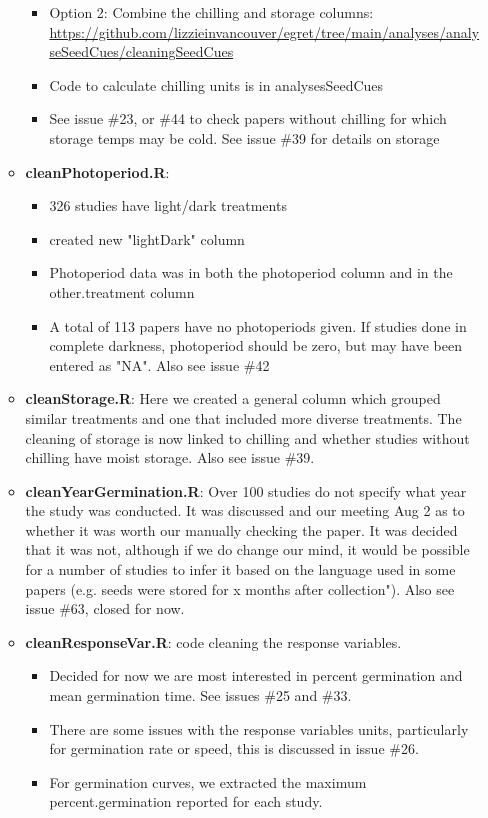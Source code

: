 \documentclass{article}[12pt]
\begin{document}
\begin{enumerate}
\begin{itemize}
\begin{itemize}
\item Option 2: Combine the chilling and storage columns: \url{https://github.com/lizzieinvancouver/egret/tree/main/analyses/analyseSeedCues/cleaningSeedCues}
\item Code to calculate chilling units is in analysesSeedCues
\item See issue \#23, or \#44 to check papers without chilling for which storage temps may be cold. See issue \#39 for details on storage
\end{itemize}
\item \textbf{cleanPhotoperiod.R}: 
\begin{itemize}
\item 326 studies have light/dark treatments
\item created new "lightDark" column
\item Photoperiod data was in both the photoperiod column and in the other.treatment column
\item A total of 113 papers have no photoperiods given. If studies done in complete darkness, photoperiod should be zero, but may have been entered as "NA". Also see issue \#42
\end{itemize}
\item \textbf{cleanStorage.R}: Here we created a general column which grouped similar treatments and one that included more diverse treatments. The cleaning of storage is now linked to chilling and whether studies without chilling have moist storage. Also see issue \#39.
\item \textbf{cleanYearGermination.R}: Over 100 studies do not specify what year the study was conducted. It was discussed and our meeting Aug 2 as to whether it was worth our manually checking the paper. It was decided that it was not, although if we do change our mind, it would be possible for a number of studies to infer it based on the language used in some papers (e.g. seeds were stored for x months after collection"). Also see issue \#63, closed for now.
\item \textbf{cleanResponseVar.R}: code cleaning the response variables. 
\begin{itemize}
\item Decided for now we are most interested in percent germination and mean germination time. See issues \#25 and \#33.
\item There are some issues with the response variables units, particularly for germination rate or speed, this is discussed in issue \#26.
\item For germination curves, we extracted the maximum percent.germination reported for each study.

\end{itemize}
\end{itemize}
\end{enumerate}
\end{document}
